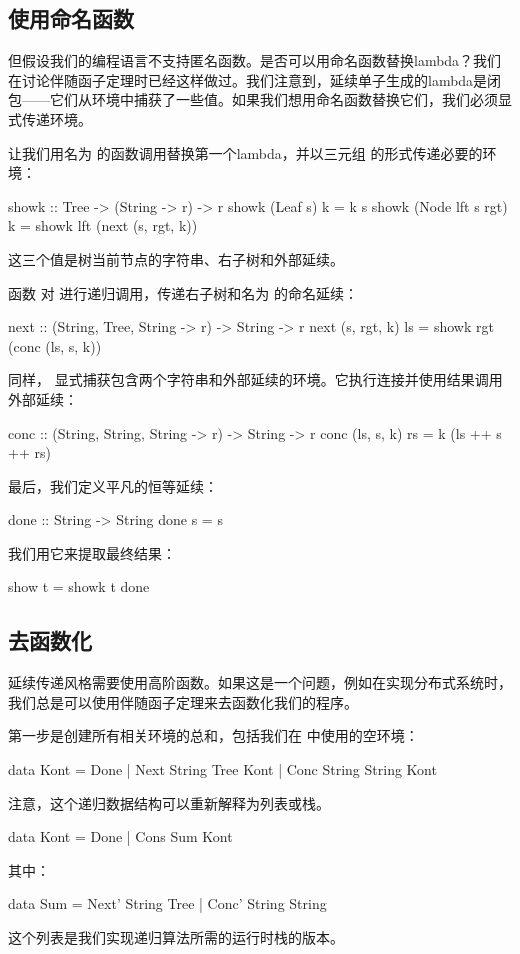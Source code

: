 \documentclass[DaoFP]{subfiles}
\begin{document}
\subsection{使用命名函数}

但假设我们的编程语言不支持匿名函数。是否可以用命名函数替换lambda？我们在讨论伴随函子定理时已经这样做过。我们注意到，延续单子生成的lambda是闭包——它们从环境中捕获了一些值。如果我们想用命名函数替换它们，我们必须显式传递环境。

让我们用名为  的函数调用替换第一个lambda，并以三元组  的形式传递必要的环境：
\begin{haskell}
showk :: Tree -> (String -> r) -> r
showk (Leaf s) k = k s
showk (Node lft s rgt) k =
  showk lft (next (s, rgt, k))
\end{haskell}
这三个值是树当前节点的字符串、右子树和外部延续。

函数  对  进行递归调用，传递右子树和名为  的命名延续：
\begin{haskell}
next :: (String, Tree, String -> r) -> String -> r
next (s, rgt, k) ls = showk rgt (conc (ls, s, k))
\end{haskell}
同样， 显式捕获包含两个字符串和外部延续的环境。它执行连接并使用结果调用外部延续：
\begin{haskell}
conc :: (String, String, String -> r) -> String -> r
conc (ls, s, k) rs = k (ls ++ s ++ rs)
\end{haskell}
最后，我们定义平凡的恒等延续：
\begin{haskell}
done :: String -> String
done s = s
\end{haskell}
我们用它来提取最终结果：
\begin{haskell}
show t = showk t done
\end{haskell}

\subsection{去函数化}

延续传递风格需要使用高阶函数。如果这是一个问题，例如在实现分布式系统时，我们总是可以使用伴随函子定理来去函数化我们的程序。

第一步是创建所有相关环境的总和，包括我们在  中使用的空环境：
\begin{haskell}
data Kont = Done 
          | Next String Tree Kont 
          | Conc String String Kont
\end{haskell}
注意，这个递归数据结构可以重新解释为列表或栈。
\begin{haskell}
data Kont = Done | Cons Sum Kont
\end{haskell}
其中：
\begin{haskell}
data Sum = Next' String Tree  | Conc' String String 
\end{haskell}
这个列表是我们实现递归算法所需的运行时栈的版本。
\end{document}
